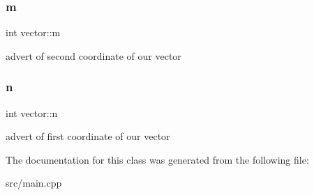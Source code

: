 \subsubsection{\texorpdfstring{m}{m}}
{\footnotesize\ttfamily int vector\+::m}

advert of second coordinate of our vector \hypertarget{classvector_a0bd97601c84f33258823f44184f94404}{}\label{classvector_a0bd97601c84f33258823f44184f94404} 
\subsubsection{\texorpdfstring{n}{n}}
{\footnotesize\ttfamily int vector\+::n}

advert of first coordinate of our vector 

The documentation for this class was generated from the following file\+:\begin{DoxyCompactItemize}
\item 
src/main.\+cpp\end{DoxyCompactItemize}
